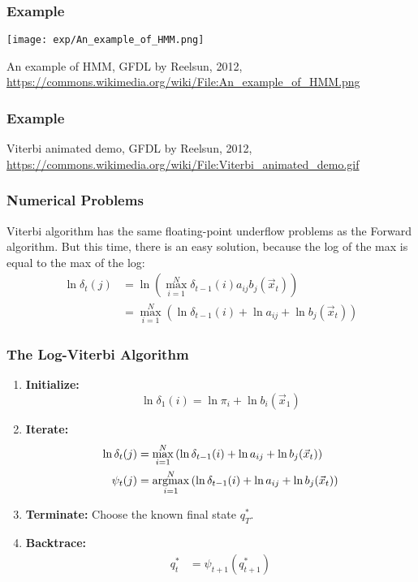 \documentclass{beamer}
\newcommand{\argmax}{\operatornamewithlimits{argmax}}
\begin{document}
\begin{frame}
  \frametitle{Example}
  \centerline{\texttt{[image: exp/An\_example\_of\_HMM.png]}}
  \begin{tiny}
    An example of HMM, GFDL by Reelsun, 2012,
    \url{https://commons.wikimedia.org/wiki/File:An_example_of_HMM.png}
  \end{tiny}
\end{frame}

\begin{frame}
  \frametitle{Example}
  \centerline{}
  \begin{tiny}
    Viterbi animated demo, GFDL by Reelsun, 2012,
    \url{https://commons.wikimedia.org/wiki/File:Viterbi_animated_demo.gif}
  \end{tiny}
\end{frame}

\begin{frame}
  \frametitle{Numerical Problems}

  Viterbi algorithm has the same floating-point underflow problems as
  the Forward algorithm.  But this time, there is an easy solution,
  because the log of the max is equal to the max of the log:
  \begin{align*}
    \ln\delta_{t}(j) &= \ln\left(\max_{i=1}^N \delta_{t-1}(i) a_{ij}b_j(\vec{x}_t)\right)\\
    &= \max_{i=1}^N\left(\ln\delta_{t-1}(i)+ \ln a_{ij}+ \ln b_j(\vec{x}_t)\right)
  \end{align*}
\end{frame}
      
\begin{frame}
  \frametitle{The Log-Viterbi Algorithm}

  \begin{enumerate}
  \item {\bf Initialize:}
    \[
    \ln\delta_1(i) = \ln\pi_i +\ln b_i(\vec{x}_1)
    \]
  \item {\bf Iterate:}
    \begin{align*}
      \ln\delta_{t}(j) &= \max_{i=1}^N \left(\ln\delta_{t-1}(i) +\ln a_{ij}+ \ln b_j(\vec{x}_t)\right)\\
      \psi_{t}(j) &= \argmax_{i=1}^N \left(\ln\delta_{t-1}(i) +\ln a_{ij}+ \ln b_j(\vec{x}_t)\right)
    \end{align*}
  \item {\bf Terminate:}
    Choose the known final state $q_T^*$.
  \item {\bf Backtrace:}
    \begin{align*}
      q_t^* &= \psi_{t+1}\left(q_{t+1}^*\right)
    \end{align*}
  \end{enumerate}
\end{frame}
\end{document}
